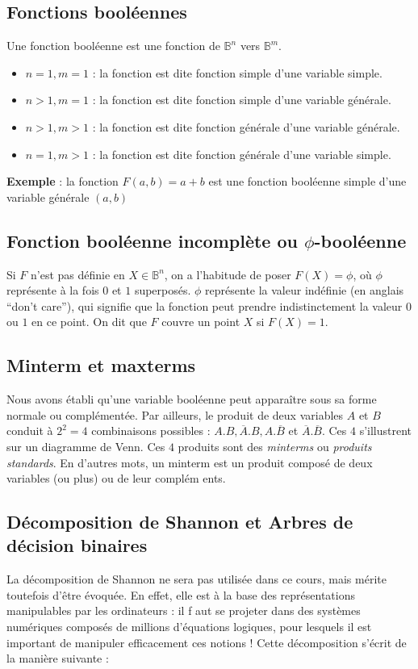 \subsection{Fonctions booléennes}
Une fonction booléenne est une fonction de $\mathbb{B}^n$ vers $\mathbb{B}^m$.

\begin{itemize}
\item $n=1,m=1$ : la fonction est dite fonction simple d'une variable simple.
\item $n>1,m=1$ : la fonction est dite fonction simple d'une variable générale.
\item $n>1,m>1$ : la fonction est dite fonction générale d'une variable générale.
\item $n=1,m>1$ : la fonction est dite fonction générale d'une variable simple.
\end{itemize}

{\bf Exemple} : la fonction $F(a,b)=a+b$ est une fonction booléenne simple d'une variable générale $(a,b)$

\subsection{Fonction booléenne incomplète ou $\phi$-booléenne}

Si $F$ n'est pas définie en $X\in \mathbb{B}^n$, on a l'habitude de poser $F(X)=\phi$, où $\phi$ représente à la fois $0$ et $1$ superposés. $\phi$ représente la valeur indéfinie (en anglais
 ``don't care''), qui signifie que la fonction peut prendre indistinctement la valeur $0$ ou $1$ en ce point. On dit que $F$ couvre un point $X$ si $F(X)=1$.

\subsection{Minterm et maxterms}
Nous avons établi qu'une variable booléenne peut apparaître sous sa forme normale ou complémentée.
Par ailleurs, le produit de deux variables $A$ et $B$ conduit à $2^2=4$ combinaisons possibles : $A.B,\overline{A}.B,A.\overline{B}$ et $\overline{A}.\overline{B}$. Ces $4$ s'illustrent sur
un diagramme de Venn. Ces $4$ produits sont des {\it minterms} ou {\it produits standards}. En d'autres mots, un minterm est un produit composé de deux variables (ou plus) ou de leur complém
ents.

\subsection{Décomposition de Shannon et Arbres de décision binaires}
La décomposition de Shannon ne sera pas utilisée dans ce cours, mais mérite toutefois d'être évoquée. En effet, elle est à la base des représentations manipulables par les ordinateurs : il f
aut se projeter dans des systèmes numériques composés de millions d'équations logiques, pour lesquels il est important de manipuler efficacement ces notions ! Cette décomposition s'écrit de
la manière suivante :


